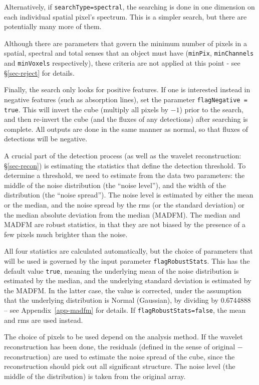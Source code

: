 Alternatively, if \texttt{searchType=spectral}, the searching is done
in one dimension on each individual spatial pixel's spectrum. This is
a simpler search, but there are potentially many more of them.

Although there are parameters that govern the minimum number of pixels
in a spatial, spectral and total senses that an object must have
(\texttt{minPix}, \texttt{minChannels} and \texttt{minVoxels}
respectively), these criteria are not applied at this point - see
\S\ref{sec-reject} for details.

Finally, the search only looks for positive features. If one is
interested instead in negative features (such as absorption lines),
set the parameter \texttt{flagNegative = true}. This will invert the
cube (\ie multiply all pixels by $-1$) prior to the search, and then
re-invert the cube (and the fluxes of any detections) after searching
is complete. All outputs are done in the same manner as normal, so
that fluxes of detections will be negative.

\label{sec-stats}

A crucial part of the detection process (as well as the wavelet
reconstruction: \S\ref{sec-recon}) is estimating the statistics that
define the detection threshold. To determine a threshold, we need to
estimate from the data two parameters: the middle of the noise
distribution (the ``noise level''), and the width of the distribution
(the ``noise spread''). The noise level is estimated by either the
mean or the median, and the noise spread by the rms (or the standard
deviation) or the median absolute deviation from the median
(MADFM). The median and MADFM are robust statistics, in that they are
not biased by the presence of a few pixels much brighter than the
noise.

All four statistics are calculated automatically, but the choice of
parameters that will be used is governed by the input parameter
\texttt{flagRobustStats}. This has the default value \texttt{true},
meaning the underlying mean of the noise distribution is estimated by
the median, and the underlying standard deviation is estimated by the
MADFM. In the latter case, the value is corrected, under the
assumption that the underlying distribution is Normal (Gaussian), by
dividing by 0.6744888 -- see Appendix~\ref{app-madfm} for details. If
\texttt{flagRobustStats=false}, the mean and rms are used instead.

The choice of pixels to be used depend on the analysis method. If the
wavelet reconstruction has been done, the residuals (defined
in the sense of original $-$ reconstruction) are used to estimate the
noise spread of the cube, since the reconstruction should pick out
all significant structure. The noise level (the middle of the
distribution) is taken from the original array.

